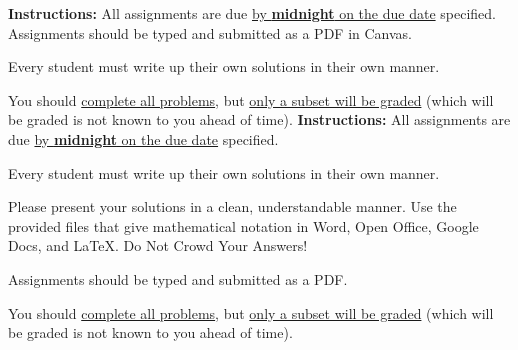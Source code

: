 
\extrawidth{0.5in} \extrafootheight{-0in} \pagestyle{headandfoot}
\headrule {} \footrule {}


\ifprintanswers
\noindent \textbf{Instructions:} All assignments are due \underline{by \textbf{midnight} on the due date} specified.  Assignments should be typed and submitted as a PDF in Canvas.   

\medskip
\noindent Every student must write up their own solutions in their own manner.

\medskip
\noindent You should \underline{complete all problems}, but \underline{only a subset will be graded} (which will be graded is not known to you ahead of time). 
\else
\noindent \textbf{Instructions:} All assignments are due \underline{by \textbf{midnight} on the due date} specified.  

\medskip
\noindent Every student must write up their own solutions in their own manner.

\medskip
\noindent Please present your solutions in a clean, understandable
manner.  Use the provided files that give mathematical notation in Word, Open Office, Google Docs, and \LaTeX.  Do Not Crowd Your Answers!

\medskip
\noindent Assignments should be typed and submitted as a PDF. 

\medskip
\noindent You should \underline{complete all problems}, but \underline{only a subset will be graded} (which will be graded is not known to you ahead of time). 
\fi


